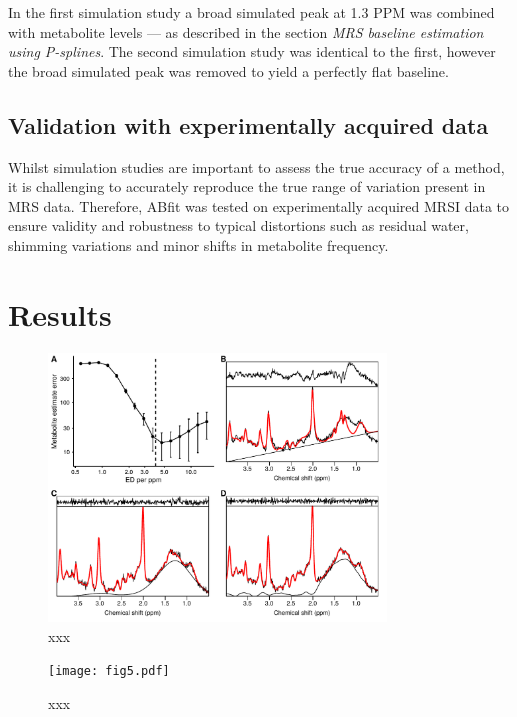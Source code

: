\documentclass[num-refs]{wiley-article}
\begin{document}
In the first simulation study a broad simulated peak at 1.3 PPM was combined with metabolite levels --- as described in the section \textit{MRS baseline estimation using P-splines}. The second simulation study was identical to the first, however the broad simulated peak was removed to yield a perfectly flat baseline.

\subsection{Validation with experimentally acquired data}
Whilst simulation studies are important to assess the true accuracy of a method, it is challenging to accurately reproduce the true range of variation present in MRS data. Therefore, ABfit was tested on experimentally acquired MRSI data to ensure validity and robustness to typical distortions such as residual water, shimming variations and minor shifts in metabolite frequency.


\section{Results}

\begin{figure}
  \begin{center}
    \includegraphics[width=0.8\textwidth]{fig4.pdf}
    \caption{xxx}
    \label{y4}
  \end{center}
\end{figure}

\begin{figure}
  \begin{center}
    \texttt{[image: fig5.pdf]}
    \caption{xxx}
    \label{y5}
  \end{center}
\end{figure}
\end{document}
